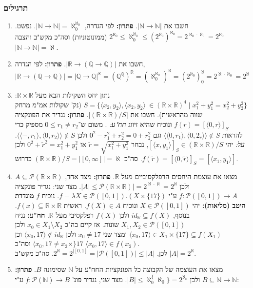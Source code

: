 \documentclass[]{article}
\newcommand\N     {\mathbb{N}}
\newcommand\R     {\mathbb{R}}
\newcommand\Q     {\mathbb{Q}}
\newcommand\ps    {\mathcal{P}}
\newcommand\ra    {\rangle}
\newcommand\la    {\langle}
\newcommand\az    {\aleph_0}
\newcommand\taz   {2^{\aleph_0}}
\newcommand\al    {\aleph}
\newcommand\tl[1] {\tilde{#1}}
\begin{document}
	\subsubsection{תרגילים}
	\begin{enumerate}
		\item חשבו את $ |\N \to \N| $. \textbf{פתרון: }לפי הגדרה, $ |\N \to \N| = \az^{\az} $. נפשט.  $ \taz \le \az^{\az} \le (\taz)^{\az} = 2^{\az \cdot \az} = \taz $ (ממונוטוניות) וסה"כ מקש"ב והצבה $ |\N \to \N| = \al $. 
		\item חשבו את $ |\R \to (\Q\to \Q)| $. \textbf{פתרון: }לפי הגדרה, $ |\R \to (\Q \to \Q)| = |\Q \to \Q|^\R = (\Q^\Q)^\R = (\az^{\az})^\al = (\taz)^\az = 2^{\al \cdot \az} = 2^\al $
		\item נתון יחס השקילות הבא מעל $ \R\times\R $: $ S = \{\la x_2, y_2 \ra, \la x_2, y_2 \ra\ \in (\R \times \R)^4 \mid x_1^2 + y_1^2 = x_2^2 + y_2^2\} $ (נק' שקולות אמ"מ מרחק שווה מהראשית). חשבו את $ |(\R\times\R) / S| $. \textbf{פתרון: } נגדיר את הפונקציה $ f(r) = [\la 0, r \ra]_S $ ונוכיח שהיא זיווג \textit{חח"ע: }. משום ש־$ 0 \le r_1 \neq r_2 $ מספיק כדי להראות $ \la \la 0, r_1 \ra, \la 0, 2_r \ra \ra \not\in S $ וגם $ 0^2 -  r_1^2 + r_2^2 = 0 + r_2^2 $ ולכן $ \la \la -, r_1 \ra, \la 0, r_2 \ra \ra \not\in S $. \textit{על: }יהי $ [\la x, y_1 \ra ]_S \in (\R\times \R) / S $, נבחר $ \tl{r} = \sqrt{x_1^2 + y_1^2} $ אז $ 0^2 + \tl{r}^2 = x_1^2 + y_1^2 $ ולכן $ f(\tl{r}) = [\la 0, \tl{r} \ra ]_S = [\la x_1, y_1 \ra] $. סה"כ $ (\R \times \R) / S = |[0, \infty]| = \al $ כדרוש. 
		\item מצאו את עוצמת היחסים הרפלקסיביים מעל $ \R $. \textbf{פתרון: }מצד אחד, $ A \subseteq \ps(\R\times \R) $ ולכן $ |A| \le \ps(\R\times\R)| = 2^{\al\cdot\al} = 2^\al $. מצד שני: נגדיר פונקציה $ f \colon \ps([0, 1]) \to A $ ע"י $ f = \lambda X \in \ps([0, 1]). (X \times \{17\}) $. נוכיח $ f $ \textbf{מוגדרת היטב (מליאות): }יהי $ X \in \ps([0, 1]) $ ונוכיח $ f(X) \in A $. ראשית $ f(x) \subseteq \R\times \R $. בנוסף, $ id_\R\subseteq f(X) $ ולכן $ f(X) $ רפלקסיבי מעל $ \R $. \textbf{חח"ע: }נניח $ X_1, X_2 \in \ps([0, 1]) $ שונות. אז קיים בה"כ $ x_0 \in X_1 \setminus X_2 $ ולכן $ \la x_0, 17 \ra \in X_1 \times \{17\} \subseteq f(X_1) $ ומצד שני $ x_0 \neq 17 $ ולכן $ \la x_0, 17 \ra \not\in id_\R $ וכן $ \la x_0, 17 \neq x_2 \times \}17 $ וסה"כ $ \la x_0, 17 \ra \in f(x_2) $. \\
		לכן, $ 2^\al = 2^{|[0, 1]} = |\ps([0, 1])| \le |A| $. סה"כ מקש"ב $ |A| = 2^\al $. 
		\item מצאו את העוצמה של הקבוצה כל הפונקציות החח"ע על $ \N $ שסימונה $ B $. \textbf{פתרון: }$ B \subseteq \N \to \N $ ולכן $ |B| \le \az^\{\az\} = \taz $. מצד שני, נגדיר פונ' $ f \colon \ps(\N) \to B $ ע"י: 

\end{enumerate}
\end{document}
